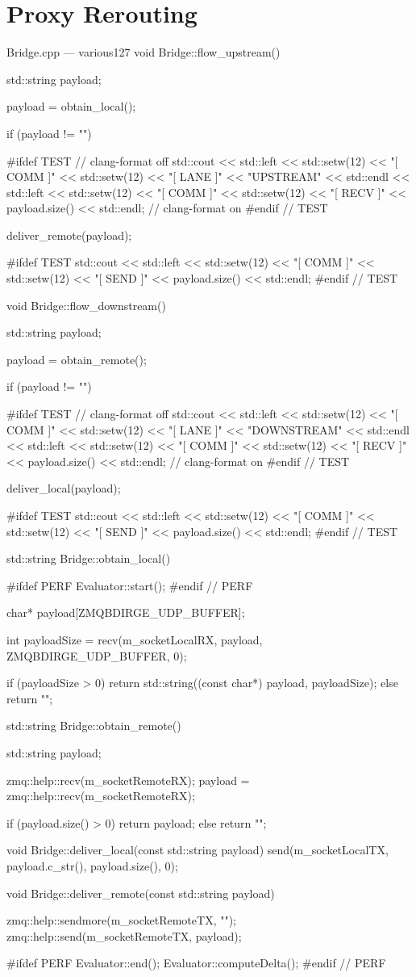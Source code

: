 \section{Proxy Rerouting}\label{ax:code:proxy}

\begin{codelist}{Bridge.cpp --- various}{127}
void Bridge::flow_upstream() {
	std::string payload;

	payload = obtain_local();

	if (payload != "") {
#ifdef TEST
		// clang-format off
		std::cout << std::left << std::setw(12) << "[ COMM ]" << std::setw(12) << "[ LANE ]" << "UPSTREAM" << std::endl
					<< std::left << std::setw(12) << "[ COMM ]" << std::setw(12) << "[ RECV ]" << payload.size() << std::endl;
		// clang-format on
#endif  // TEST

		deliver_remote(payload);

#ifdef TEST
		std::cout << std::left << std::setw(12) << "[ COMM ]" << std::setw(12) << "[ SEND ]" << payload.size() << std::endl;
#endif  // TEST
	}
}

void Bridge::flow_downstream() {
	std::string payload;

	payload = obtain_remote();

	if (payload != "") {
#ifdef TEST
		// clang-format off
		std::cout << std::left << std::setw(12) << "[ COMM ]" << std::setw(12) << "[ LANE ]" << "DOWNSTREAM" << std::endl
					<< std::left << std::setw(12) << "[ COMM ]" << std::setw(12) << "[ RECV ]" << payload.size() << std::endl;
		// clang-format on
#endif  // TEST

		deliver_local(payload);

#ifdef TEST
		std::cout << std::left << std::setw(12) << "[ COMM ]" << std::setw(12) << "[ SEND ]" << payload.size() << std::endl;
#endif  // TEST
	}
}

std::string Bridge::obtain_local() {
#ifdef PERF
	Evaluator::start();
#endif  // PERF

	char* payload[ZMQBDIRGE_UDP_BUFFER];

	int payloadSize = recv(m_socketLocalRX, payload, ZMQBDIRGE_UDP_BUFFER, 0);

	if (payloadSize > 0) {
		return std::string((const char*) payload, payloadSize);
	} else {
		return "";
	}
}

std::string Bridge::obtain_remote() {
	std::string payload;

	zmq::help::recv(m_socketRemoteRX);
	payload = zmq::help::recv(m_socketRemoteRX);

	if (payload.size() > 0) {
		return payload;
	} else {
		return "";
	}
}

void Bridge::deliver_local(const std::string payload) {
	send(m_socketLocalTX, payload.c_str(), payload.size(), 0);
}

void Bridge::deliver_remote(const std::string payload) {
	zmq::help::sendmore(m_socketRemoteTX, "");
	zmq::help::send(m_socketRemoteTX, payload);

#ifdef PERF
	Evaluator::end();
	Evaluator::computeDelta();
#endif  // PERF
}
\end{codelist}
